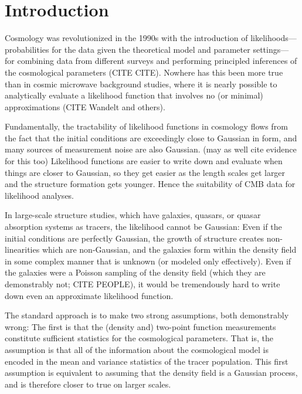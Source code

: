 \documentclass[12pt, preprint]{aastex}
\begin{document}
\section{Introduction}

Cosmology was revolutionized in the 1990s with the introduction of likelihoods---%
pro\-ba\-bil\-ities for the data given the theoretical model and parameter settings---%
for combining data from different surveys and performing principled inferences of
the cosmological parameters (CITE CITE).
Nowhere has this been more true than in cosmic microwave background studies,
where it is nearly possible to analytically evaluate a likelihood function that
involves no (or minimal) approximations (CITE Wandelt and others).

Fundamentally, the tractability of likelihood functions in cosmology flows from
the fact that the initial conditions are exceedingly close to Gaussian in form,
and many sources of measurement noise are also Gaussian. (may as well cite evidence for this too)
Likelihood functions are easier to write down and evaluate when things are closer to Gaussian,
so they get easier as the length scales get larger and the structure formation gets
younger.
Hence the suitability of CMB data for likelihood analyses.

In large-scale structure studies, which have galaxies, quasars, or quasar absorption
systems as tracers, the likelihood cannot be Gaussian:
Even if the initial conditions are perfectly Gaussian, the growth of structure
creates non-linearities which are non-Gaussian, and the galaxies form
within the density field in some complex manner that is unknown (or modeled only effectively).
Even if the galaxies were a Poisson sampling of the density field (which they are demonstrably
not; CITE PEOPLE), it would be tremendously hard to write down even an approximate
likelihood function.

The standard approach is to make two strong assumptions, both demonstrably wrong:
The first is that the (density and) two-point function measurements constitute
sufficient statistics for the cosmological parameters.
That is, the assumption is that all of the information about the cosmological model is
encoded in the mean and variance statistics of the tracer population.
This first assumption is equivalent to assuming that the density field is a Gaussian process,
and is therefore closer to true on larger scales.
\end{document}
